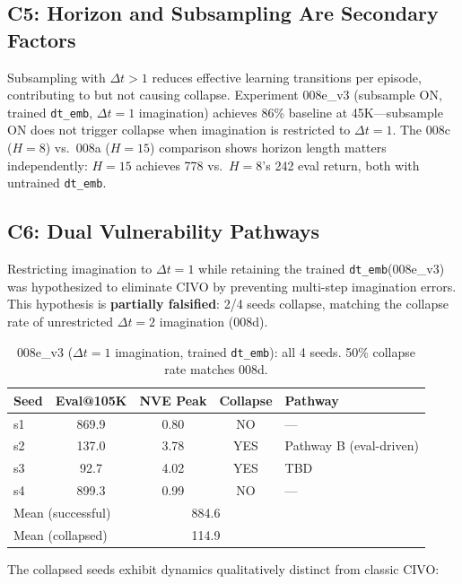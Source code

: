 \documentclass[letterpaper]{article}
\newcommand{\civo}{CIVO\xspace}
\newcommand{\dtemb}{\texttt{dt\_emb}\xspace}
\begin{document}
\subsection{C5: Horizon and Subsampling Are Secondary Factors}

Subsampling with $\Delta t > 1$ reduces effective learning transitions per episode, contributing to but not causing collapse. Experiment 008e\_v3 (subsample ON, trained \dtemb, $\Delta t = 1$ imagination) achieves 86\% baseline at 45K---subsample ON does not trigger collapse when imagination is restricted to $\Delta t = 1$. The 008c ($H=8$) vs.\ 008a ($H=15$) comparison shows horizon length matters independently: $H=15$ achieves 778 vs.\ $H=8$'s 242 eval return, both with untrained \dtemb.

\subsection{C6: Dual Vulnerability Pathways}
\label{sec:c6}

Restricting imagination to $\Delta t = 1$ while retaining the trained \dtemb (008e\_v3) was hypothesized to eliminate \civo by preventing multi-step imagination errors. This hypothesis is \textbf{partially falsified}: 2/4 seeds collapse, matching the collapse rate of unrestricted $\Delta t = 2$ imagination (008d).

\begin{table}[h]
\centering
\caption{008e\_v3 ($\Delta t = 1$ imagination, trained \dtemb): all 4 seeds. 50\% collapse rate matches 008d.}
\label{tab:008e_v3}
\begin{tabular}{lcccl}
\toprule
Seed & Eval@105K & NVE Peak & Collapse & Pathway \\
\midrule
s1 & 869.9 & 0.80 & NO & --- \\
s2 & 137.0 & 3.78 & YES & Pathway B (eval-driven) \\
s3 & 92.7 & 4.02 & YES & TBD \\
s4 & 899.3 & 0.99 & NO & --- \\
\midrule
\multicolumn{2}{l}{Mean (successful)} & \multicolumn{2}{c}{884.6} & \\
\multicolumn{2}{l}{Mean (collapsed)} & \multicolumn{2}{c}{114.9} & \\
\bottomrule
\end{tabular}
\end{table}

The collapsed seeds exhibit dynamics qualitatively distinct from classic \civo:
\end{document}
